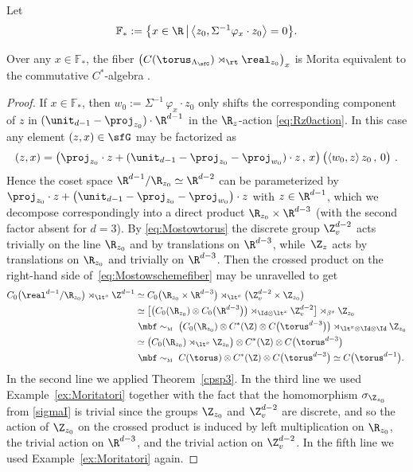 Let
\[
\mathbb{F}_* := \big\{x\in\R \, \big| \, \big\langle
z_0,\Sigma^{-1} \varphi_x\cdot z_0\big\rangle=0\big\} .
\]
\begin{Lemma}\label{lem:ellfibercom}
Over any $x\in \mathbb{F}_*$, the fiber
$\big(C(\torus_{\Lambda_\sfG})\rtimes_\rt\real_{ z_0}\big)_x$
is Morita equivalent to the
commutative $C^*$-algebra .
\end{Lemma}
\begin{proof}
If $x\in\mathbb{F}_*$, then $w_0:=\Sigma^{-1}\,\varphi_x\cdot z_0$ only
shifts the corresponding component of $ z$ in
$(\unit_{d-1}-\proj_{ z_0})\cdot\R^{d-1}$ in the $\R_{z}$-action
\eqref{eq:Rz0action}. In this case any
element $(z,x)\in\sfG$ may be factorized as
$$
(z,x) = \big(\proj_{ z_0}\cdot
z+(\unit_{d-1}-\proj_{z_0}-\proj_{w_0})\cdot z\,,\,x\big) \,
\big(\langle w_0,z\rangle\, z_0 \,,\,0\big) \ .
$$
Hence the coset space $\R^{d-1}/\R_{ z_0}\simeq\R^{d-2}$ can be
parameterized by $\proj_{ z_0}\cdot
z+\big(\unit_{d-1}-\proj_{z_0}-\proj_{w_0}\big)\cdot z$ with $z\in\R^{d-1}$,
which we decompose correspondingly into a direct product
$\R_{z_0}\times\R^{d-3}$ (with the second factor absent for $d=3$). By \eqref{eq:Mostowtorus} the discrete group
$\Z_v^{d-2}$ acts trivially on the line $\R_{z_0}$ and by translations
on $\R^{d-3}$,
while~$\Z_{ z}$ acts by translations on $\R_{z_0}$ and trivially
on $\R^{d-3}$. Then the crossed product on the right-hand side of~\eqref{eq:Mostowschemefiber} may be unravelled to get
\begin{align*}
C_0\big(\real^{d-1}/\R_{ z_0}\big)\rtimes_{\lt^x}\Z^{d-1}
&\simeq C_0\big(\R_{
 z_0}\times\R^{d-3}\big)\rtimes_{\lt^x}\big(\Z_v^{d-2}\times\Z_{ z_0}\big) \\
&\simeq
\big[\big(C_0(\R_{z_0})\otimes C_0\big(\R^{d-3}\big)\big)\rtimes_{\Id\otimes\lt^x}\Z^{d-2}_v\big]\rtimes_{\beta^x}\Z_{z_0} \\
& \ \mbf\sim_{\text{\tiny M}} \ \big(C_0(\R_{ z_0})\otimes C^*(\Z)\otimes C\big(\torus^{d-3}\big)\big)\rtimes_{\lt^x\otimes\Id\otimes\Id}\Z_{ z_0}
 \\
&\simeq \big(C_0(\R_{ z_0})\rtimes_{\lt^x}\Z_{ z_0}\big)\otimes
C^*(\Z)\otimes C\big(\torus^{d-3}\big)
\nonumber\\
& \ \mbf\sim_{\text{\tiny M}} \ C(\torus)\otimes C^*(\Z)\otimes C\big(\torus^{d-3}\big) \simeq C\big(\torus^{d-1}\big) .
\end{align*}
In the second line we applied
Theorem~\ref{cpsp3}. In the third line we used
Example~\ref{ex:Moritatori} together with the fact that the
homomorphism $\sigma_{\Z_{ z_0}}$ from \eqref{sigmaI} is trivial since the
groups $\Z_{ z_0}$ and $\Z_v^{d-2}$ are discrete, and so the action of $\Z_{ z_0}$ on the crossed
product is induced by left multiplication on $\R_{ z_0}$, the trivial
action on $\R^{d-3}$, and the
trivial action on $\Z_v^{d-2}$. In the fifth line we used
Example~\ref{ex:Moritatori} again.
\end{proof}

